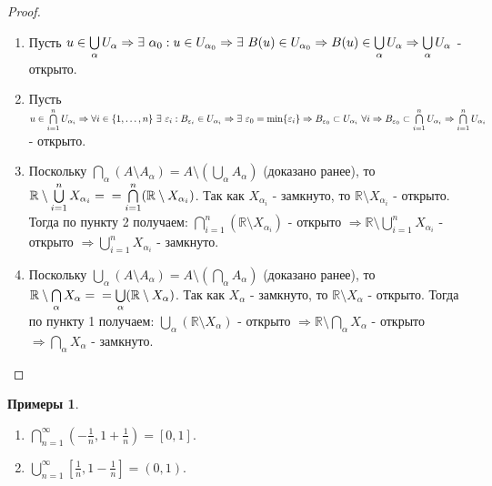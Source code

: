 \documentclass[a4paper, 12pt]{article}
\newcommand{\R}{\mathbb{R}}
\renewcommand{\epsilon}{\varepsilon}
\newcommand\tab[1][.5cm]{\hspace*{#1}}
\theoremstyle{definition}
\newtheorem*{examples}{Примеры}
\begin{document}
        \begin{proof} \tab
            \begin{enumerate}
                \item Пусть $u\in \bigcup\limits_{\alpha} U_{\alpha} \Rightarrow \exists\ \alpha_0: u\in U_{\alpha_0}\Rightarrow \exists\ B(u)\in U_{\alpha_0}\Rightarrow B(u)\in \bigcup\limits_{\alpha} U_{\alpha}\\
                \Rightarrow \bigcup\limits_{\alpha} U_{\alpha}$ - открыто.
                \item Пусть $u\in \bigcap\limits_{i=1}^n U_{\alpha_i} \Rightarrow \forall i\in \{1,\dots, n\}\ \exists\ \epsilon_i: B_{\epsilon_i}\in U_{\alpha_i}\Rightarrow \exists\ \epsilon_0 = \min\{\epsilon_{i}\}\\
                \Rightarrow B_{\epsilon_{0}}\subset U_{\alpha_i}\ \forall i \Rightarrow B_{\epsilon_{0}}\subset \bigcap\limits_{i=1}^n U_{\alpha_i} \Rightarrow \bigcap\limits_{i=1}^n U_{\alpha_i}$ - открыто.
                \item Поскольку $\bigcap\limits_{\alpha}(A\setminus A_{\alpha}) = A\setminus (\bigcup\limits_{\alpha}A_{\alpha})$ (доказано ранее), то $\R \setminus \bigcup\limits_{i=1}^n X_{\alpha_i}=\\
                =\bigcap\limits_{i=1}^n(\R \setminus X_{\alpha_i})$. Так как $X_{\alpha_i}$ - замкнуто, то $\R \setminus X_{\alpha_i}$ - открыто. Тогда по пункту 2 получаем: $\bigcap\limits_{i=1}^n(\R \setminus X_{\alpha_i})$ - открыто $\Rightarrow \R \setminus \bigcup\limits_{i=1}^n X_{\alpha_i}$ - открыто $\Rightarrow \bigcup\limits_{i=1}^n X_{\alpha_i}$ - замкнуто.
                \item Поскольку $\bigcup\limits_{\alpha}(A\setminus A_{\alpha}) = A\setminus (\bigcap\limits_{\alpha}A_{\alpha})$ (доказано ранее), то $\R \setminus \bigcap\limits_{\alpha} X_{\alpha}=\\
                =\bigcup\limits_{\alpha}(\R \setminus X_{\alpha})$. Так как $X_{\alpha}$ - замкнуто, то $\R \setminus X_{\alpha}$ - открыто. Тогда по пункту 1 получаем: $\bigcup\limits_{\alpha}(\R \setminus X_{\alpha})$ - открыто $\Rightarrow \R \setminus \bigcap\limits_{\alpha} X_{\alpha}$ - открыто $\Rightarrow \bigcap\limits_{\alpha}X_{\alpha}$ - замкнуто.
            \end{enumerate}
        \end{proof} 
        \begin{examples} \tab
            \begin{enumerate}
                \item $\bigcap\limits_{n=1}^{\infty}(-\frac{1}{n}, 1+\frac{1}{n})=[0,1]$.
                \item $\bigcup\limits_{n=1}^{\infty}[\frac{1}{n}, 1-\frac{1}{n}]=(0,1)$.
            \end{enumerate}
        \end{examples}
\end{document}
